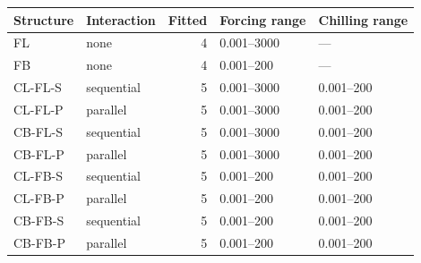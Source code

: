 \begin{tabular}{llrll}
\toprule
Structure & Interaction & Fitted & Forcing range & Chilling range \\
\midrule
FL & none & 4 & 0.001--3000 & --- \\
FB & none & 4 & 0.001--200 & --- \\
CL-FL-S & sequential & 5 & 0.001--3000 & 0.001--200 \\
CL-FL-P & parallel & 5 & 0.001--3000 & 0.001--200 \\
CB-FL-S & sequential & 5 & 0.001--3000 & 0.001--200 \\
CB-FL-P & parallel & 5 & 0.001--3000 & 0.001--200 \\
CL-FB-S & sequential & 5 & 0.001--200 & 0.001--200 \\
CL-FB-P & parallel & 5 & 0.001--200 & 0.001--200 \\
CB-FB-S & sequential & 5 & 0.001--200 & 0.001--200 \\
CB-FB-P & parallel & 5 & 0.001--200 & 0.001--200 \\
\bottomrule
\end{tabular}

